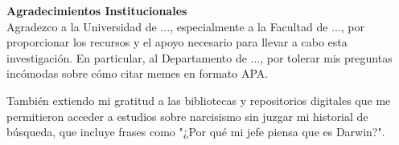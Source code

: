 \begin{center}
    {\large \textbf{Agradecimientos Institucionales}}\\[0.3cm]

    Agradezco a la Universidad de ..., especialmente a la Facultad de ..., por proporcionar los recursos y el apoyo necesario para llevar a cabo esta investigación. En particular, al Departamento de ..., por tolerar mis preguntas incómodas sobre cómo citar memes en formato APA.

    También extiendo mi gratitud a las bibliotecas y repositorios digitales que me permitieron acceder a estudios sobre narcisismo sin juzgar mi historial de búsqueda, que incluye frases como "¿Por qué mi jefe piensa que es Darwin?".
\end{center}
